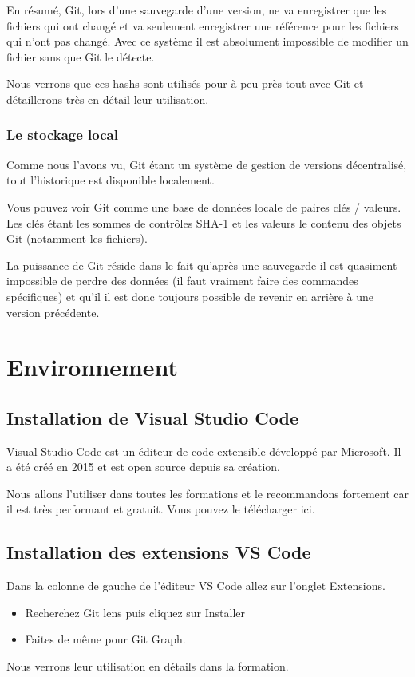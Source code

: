 \documentclass{article}
\begin{document}
En résumé, {\color{blue}Git}, lors d'une sauvegarde d'une version, ne va enregistrer que les fichiers qui ont changé et va seulement enregistrer une référence pour les fichiers qui n'ont pas changé. Avec ce système il est absolument impossible de modifier un fichier sans que {\color{blue}Git} le détecte.

Nous verrons que ces {\color{blue}hashs} sont utilisés pour à peu près tout avec {\color{blue}Git} et détaillerons très en détail leur utilisation.

\subsubsection{Le stockage local}
Comme nous l'avons vu, {\color{blue}Git} étant un système de gestion de versions décentralisé, tout l'historique est disponible localement.

Vous pouvez voir {\color{blue}Git} comme une base de données locale de paires clés / valeurs. Les clés étant les sommes de contrôles {\color{blue}SHA-1} et les valeurs le contenu des objets {\color{blue}Git} (notamment les fichiers).

La puissance de {\color{blue}Git} réside dans le fait qu'après une sauvegarde il est quasiment impossible de perdre des données (il faut vraiment faire des commandes spécifiques) et qu'il il est donc toujours possible de revenir en arrière à une version précédente.

\section{Environnement}
\subsection{Installation de {\color{blue}Visual Studio Code}}
{\color{blue}Visual Studio Code} est un éditeur de code extensible développé par Microsoft. Il a été créé en 2015 et est {\color{blue}open source} depuis sa création.

Nous allons l'utiliser dans toutes les formations et le recommandons fortement car il est très performant et gratuit. Vous pouvez le télécharger {\color{blue}ici}.

\subsection{Installation des extensions {\color{blue}VS Code}}
Dans la colonne de gauche de l'éditeur {\color{blue}VS Code} allez sur l'onglet Extensions.
\begin{itemize}
\item Recherchez {\color{blue}Git lens} puis cliquez sur Installer
\item Faites de même pour {\color{blue}Git Graph}.
\end{itemize}
Nous verrons leur utilisation en détails dans la formation.
\end{document}
